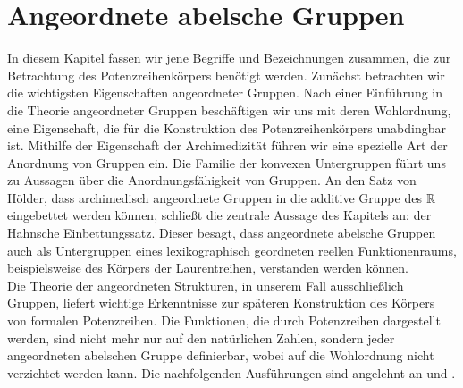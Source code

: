 \chapter{Angeordnete abelsche Gruppen}\label{chap2} %
In diesem Kapitel fassen wir jene Begriffe und Bezeichnungen zusammen, die zur Betrachtung des Potenzreihenkörpers benötigt werden. Zunächst betrachten wir die wichtigsten Eigenschaften angeordneter Gruppen. Nach einer Einführung in die Theorie angeordneter Gruppen beschäftigen wir uns mit deren Wohlordnung, eine Eigenschaft, die für die Konstruktion des Potenzreihenkörpers unabdingbar ist. Mithilfe der Eigenschaft der Archimedizität führen wir eine spezielle Art der Anordnung von Gruppen ein. Die Familie der konvexen Untergruppen führt uns zu Aussagen über die Anordnungsfähigkeit von Gruppen. An den Satz von Hölder, dass archimedisch angeordnete Gruppen in die additive Gruppe des $\mathbb{R}$ eingebettet werden können,  schließt die zentrale Aussage des Kapitels an: der Hahnsche Einbettungssatz. Dieser besagt, dass angeordnete abelsche Gruppen auch als Untergruppen eines lexikographisch geordneten reellen Funktionenraums, beispielsweise des Körpers der Laurentreihen, verstanden werden können. \\
Die Theorie der angeordneten Strukturen, in unserem Fall ausschließlich Gruppen, liefert wichtige Erkenntnisse zur späteren Konstruktion des Körpers von formalen Potenzreihen. Die Funktionen, die durch Potenzreihen dargestellt werden, sind nicht mehr nur auf den natürlichen Zahlen, sondern jeder angeordneten abelschen Gruppe definierbar, wobei auf die Wohlordnung nicht verzichtet werden kann. 
Die nachfolgenden Ausführungen sind angelehnt an \cite[S. 21 - 28]{fuchs66} und \cite[S. 1 -  4]{priesscrampe83}.
%
%

